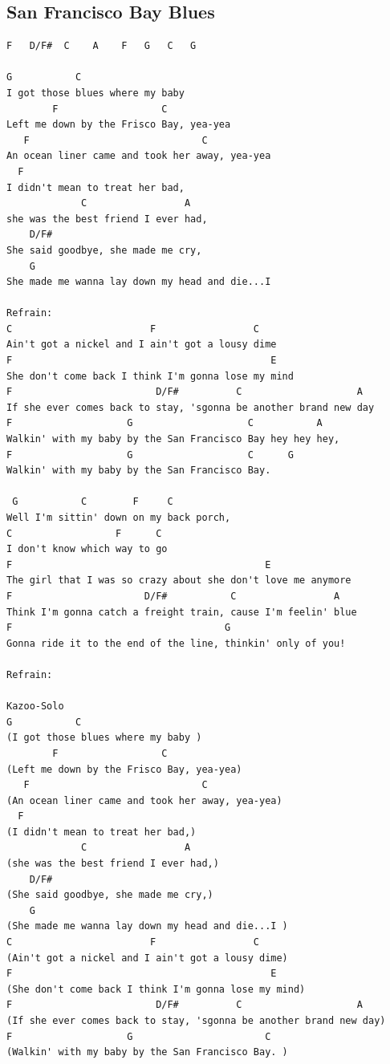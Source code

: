 \documentclass[a4paper]{article}
\begin{document}
\subsection{San Francisco Bay Blues} %
\label{sub:San Francisco Bay Blues}
\begin{Verbatim}[commandchars=\\\{\}]
F   D/F#  C    A    F   G   C   G 

G           C
I got those blues where my baby 
        F                  C
Left me down by the Frisco Bay, yea-yea
   F                              C
An ocean liner came and took her away, yea-yea
  F                        
I didn't mean to treat her bad,
             C                 A
she was the best friend I ever had,
    D/F#         
She said goodbye, she made me cry,
    G
She made me wanna lay down my head and die...I 

Refrain:
C                        F                 C
Ain't got a nickel and I ain't got a lousy dime
F                                             E
She don't come back I think I'm gonna lose my mind
F                         D/F#          C                    A
If she ever comes back to stay, 'sgonna be another brand new day
F                    G                    C           A
Walkin' with my baby by the San Francisco Bay hey hey hey,
F                    G                    C      G
Walkin' with my baby by the San Francisco Bay. 

 G           C        F     C
Well I'm sittin' down on my back porch, 
C                  F      C
I don't know which way to go
F                                            E
The girl that I was so crazy about she don't love me anymore
F                       D/F#           C                 A
Think I'm gonna catch a freight train, cause I'm feelin' blue
F                                     G
Gonna ride it to the end of the line, thinkin' only of you! 

Refrain:

Kazoo-Solo
G           C
(I got those blues where my baby )
        F                  C
(Left me down by the Frisco Bay, yea-yea)
   F                              C
(An ocean liner came and took her away, yea-yea)
  F                        
(I didn't mean to treat her bad,)
             C                 A
(she was the best friend I ever had,)
    D/F#         
(She said goodbye, she made me cry,)
    G
(She made me wanna lay down my head and die...I )
C                        F                 C
(Ain't got a nickel and I ain't got a lousy dime)
F                                             E
(She don't come back I think I'm gonna lose my mind)
F                         D/F#          C                    A
(If she ever comes back to stay, 'sgonna be another brand new day)
F                    G                       C          
(Walkin' with my baby by the San Francisco Bay. )



\end{Verbatim}
\end{document}
